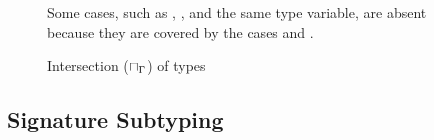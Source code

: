 \begin{figure}
{\begin{minipage}{14cm}
\[\]
\end{minipage}}
\caption{Intersection ($\sqcap_{\Gamma}$) of types}\label{fig:ty-join-meet}
\begin{tablenotes}[para]
\small
Some cases, such as \tybot, \tyany, and the same type variable,
are absent because they are covered by the cases  and 
.
\end{tablenotes}
\end{figure}

\subsection{Signature Subtyping}%
\label{subsec:dec-sub:subtysig}

